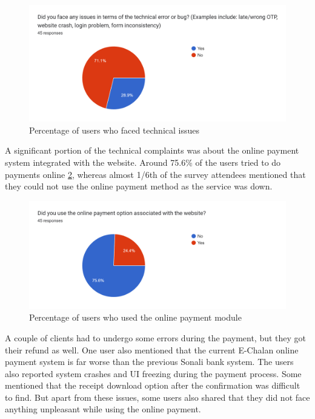 \begin{figure}[ht]
\centering
\centerline{\includegraphics[width=\linewidth]{Figures/issuetech.png}}
\vspace{-10pt}\caption{Percentage of users who faced technical issues}
\label{fig:issuetech}
\end{figure}

A significant portion of the technical complaints was about the online payment system integrated with the website. Around 75.6\% of the users tried to do payments online \ref{fig:payment}, whereas almost 1/6th of the survey attendees mentioned that they could not use the online payment method as the service was down.

\begin{figure}[ht]
\centering
\centerline{\includegraphics[width=\linewidth]{Figures/payment.png}}
\vspace{-10pt}\caption{Percentage of users who used the online payment module}
\label{fig:payment}
\end{figure}

A couple of clients had to undergo some errors during the payment, but they got their refund as well. One user also mentioned that the current E-Chalan online payment system is far worse than the previous Sonali bank system. The users also reported system crashes and UI freezing during the payment process. Some mentioned that the receipt download option after the confirmation was difficult to find. But apart from these issues, some users also shared that they did not face anything unpleasant while using the online payment.
\newline

